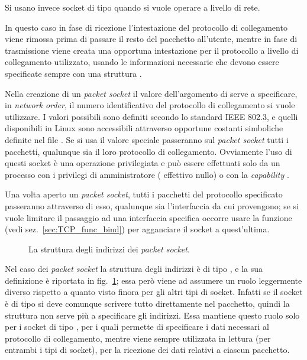 Si usano invece socket di tipo  quando si vuole operare a
livello di rete. 

In questo caso in fase di ricezione l'intestazione del protocollo di
collegamento viene rimossa prima di passare il resto del pacchetto all'utente,
mentre in fase di trasmissione viene creata una opportuna intestazione per il
protocollo a livello di collegamento utilizzato, usando le informazioni
necessarie che devono essere specificate sempre con una struttura
.

Nella creazione di un \textit{packet socket} il valore dell'argomento
 di  serve a specificare, in \textit{network
  order}, il numero identificativo del protocollo di collegamento si vuole
utilizzare. I valori possibili sono definiti secondo lo standard IEEE 802.3, e
quelli disponibili in Linux sono accessibili attraverso opportune costanti
simboliche definite nel file . Se si usa il valore
speciale  passeranno sul \textit{packet socket} tutti i
pacchetti, qualunque sia il loro protocollo di collegamento. Ovviamente l'uso
di questi socket è una operazione privilegiata e può essere effettuati solo da
un processo con i privilegi di amministratore ( effettivo nullo) o
con la \textit{capability} .

Una volta aperto un \textit{packet socket}, tutti i pacchetti del protocollo
specificato passeranno attraverso di esso, qualunque sia l'interfaccia da cui
provengono; se si vuole limitare il passaggio ad una interfaccia specifica
occorre usare la funzione  (vedi sez.~\ref{sec:TCP_func_bind}) per
agganciare il socket a quest'ultima.

\begin{figure}[!htb]
  \footnotesize \centering
  \begin{minipage}[c]{\textwidth}
  \end{minipage} 
  \caption{La struttura  degli indirizzi dei
    \textit{packet socket}.}
  \label{fig:sock_sa_packet_struct}
\end{figure}

Nel caso dei \textit{packet socket} la struttura degli indirizzi è di tipo
, e la sua definizione è riportata in
fig.~\ref{fig:sock_sa_packet_struct}; essa però viene ad assumere un ruolo
leggermente diverso rispetto a quanto visto finora per gli altri tipi di
socket.  Infatti se il socket è di tipo  si deve comunque
scrivere tutto direttamente nel pacchetto, quindi la struttura non serve più a
specificare gli indirizzi. Essa mantiene questo ruolo solo per i socket di
tipo , per i quali permette di specificare i dati necessari
al protocollo di collegamento, mentre viene sempre utilizzata in lettura (per
entrambi i tipi di socket), per la ricezione dei dati relativi a ciascun
pacchetto.


